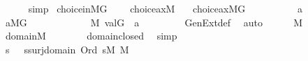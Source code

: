 \begin{isabellebody}
\ \ \ \ \isamarkupfalse%
\ simp\isanewline
{}\isamarkupfalse%
%
\endisatagproof
{\isafoldproof}%
%
\isadelimproof
\isanewline
%
\endisadelimproof
\isanewline
\isanewline
\isanewline
{}\isamarkupfalse%
\ choice{\isacharunderscore}{\kern0pt}in{\isacharunderscore}{\kern0pt}MG{\isacharcolon}{\kern0pt}\ \isanewline
\ \ \ {\isachardoublequoteopen}choice{\isacharunderscore}{\kern0pt}ax{\isacharparenleft}{\kern0pt}{\isacharhash}{\kern0pt}{\isacharhash}{\kern0pt}M{\isacharparenright}{\kern0pt}{\isachardoublequoteclose}\isanewline
\ \ \ {\isachardoublequoteopen}choice{\isacharunderscore}{\kern0pt}ax{\isacharparenleft}{\kern0pt}{\isacharhash}{\kern0pt}{\isacharhash}{\kern0pt}M{\isacharbrackleft}{\kern0pt}G{\isacharbrackright}{\kern0pt}{\isacharparenright}{\kern0pt}{\isachardoublequoteclose}\isanewline
%
\isadelimproof
%
\endisadelimproof
%
\isatagproof
{}\isamarkupfalse%
\ {\isacharminus}{\kern0pt}\isanewline
\ \ \isacommand{{\isacharbraceleft}{\kern0pt}}\isamarkupfalse%
\isanewline
\ \ \ \ \isamarkupfalse%
\ a\isanewline
\ \ \ \ \isamarkupfalse%
\ {\isachardoublequoteopen}a{\isasymin}M{\isacharbrackleft}{\kern0pt}G{\isacharbrackright}{\kern0pt}{\isachardoublequoteclose}\isanewline
\ \ \ \ \isamarkupfalse%
\isanewline
\ \ \ \ \isamarkupfalse%
\ {\isasymtau}\ \ {\isachardoublequoteopen}{\isasymtau}{\isasymin}M{\isachardoublequoteclose}\ {\isachardoublequoteopen}val{\isacharparenleft}{\kern0pt}G{\isacharcomma}{\kern0pt}{\isasymtau}{\isacharparenright}{\kern0pt}\ {\isacharequal}{\kern0pt}\ a{\isachardoublequoteclose}\ \isanewline
\ \ \ \ \ \ \isamarkupfalse%
\ GenExt{\isacharunderscore}{\kern0pt}def\ \isamarkupfalse%
\ auto\isanewline
\ \ \ \ \isamarkupfalse%
\ {\isacartoucheopen}{\isasymtau}{\isasymin}M{\isacartoucheclose}\isanewline
\ \ \ \ \isamarkupfalse%
\ {\isachardoublequoteopen}domain{\isacharparenleft}{\kern0pt}{\isasymtau}{\isacharparenright}{\kern0pt}{\isasymin}M{\isachardoublequoteclose}\isanewline
\ \ \ \ \ \ \isamarkupfalse%
\ domain{\isacharunderscore}{\kern0pt}closed\ \isamarkupfalse%
\ simp\isanewline
\ \ \ \ \isamarkupfalse%
\isanewline
\ \ \ \ \isamarkupfalse%
\ s\ {\isasymalpha}\ \ {\isachardoublequoteopen}s{\isasymin}surj{\isacharparenleft}{\kern0pt}{\isasymalpha}{\isacharcomma}{\kern0pt}domain{\isacharparenleft}{\kern0pt}{\isasymtau}{\isacharparenright}{\kern0pt}{\isacharparenright}{\kern0pt}{\isachardoublequoteclose}\ {\isachardoublequoteopen}Ord{\isacharparenleft}{\kern0pt}{\isasymalpha}{\isacharparenright}{\kern0pt}{\isachardoublequoteclose}\ {\isachardoublequoteopen}s{\isasymin}M{\isachardoublequoteclose}\ {\isachardoublequoteopen}{\isasymalpha}{\isasymin}M{\isachardoublequoteclose}\isanewline

\end{isabellebody}

